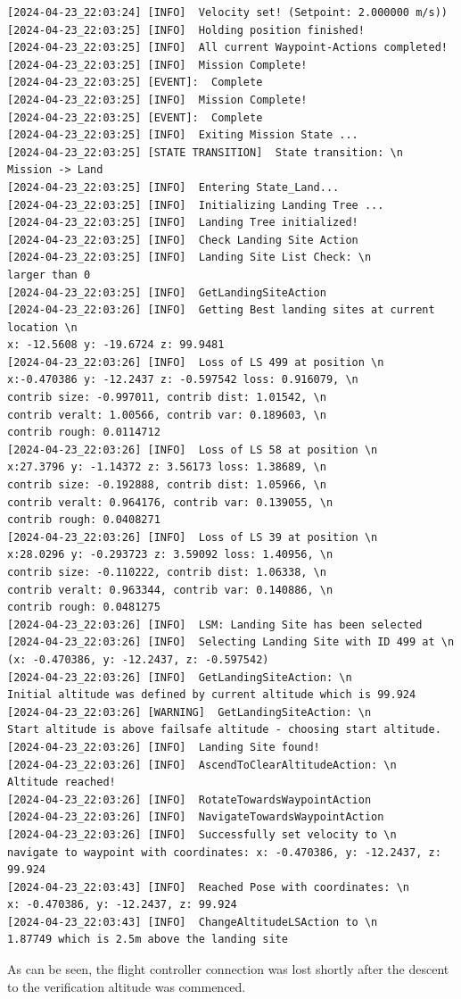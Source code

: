 \begin{lstlisting}
[2024-04-23_22:03:24] [INFO]  Velocity set! (Setpoint: 2.000000 m/s))
[2024-04-23_22:03:25] [INFO]  Holding position finished!
[2024-04-23_22:03:25] [INFO]  All current Waypoint-Actions completed!
[2024-04-23_22:03:25] [INFO]  Mission Complete!
[2024-04-23_22:03:25] [EVENT]:  Complete
[2024-04-23_22:03:25] [INFO]  Mission Complete!
[2024-04-23_22:03:25] [EVENT]:  Complete
[2024-04-23_22:03:25] [INFO]  Exiting Mission State ...
[2024-04-23_22:03:25] [STATE TRANSITION]  State transition: \n 
Mission -> Land
[2024-04-23_22:03:25] [INFO]  Entering State_Land...
[2024-04-23_22:03:25] [INFO]  Initializing Landing Tree ...
[2024-04-23_22:03:25] [INFO]  Landing Tree initialized!
[2024-04-23_22:03:25] [INFO]  Check Landing Site Action
[2024-04-23_22:03:25] [INFO]  Landing Site List Check: \n 
larger than 0
[2024-04-23_22:03:25] [INFO]  GetLandingSiteAction
[2024-04-23_22:03:26] [INFO]  Getting Best landing sites at current location \n 
x: -12.5608 y: -19.6724 z: 99.9481
[2024-04-23_22:03:26] [INFO]  Loss of LS 499 at position \n 
x:-0.470386 y: -12.2437 z: -0.597542 loss: 0.916079, \n 
contrib size: -0.997011, contrib dist: 1.01542, \n 
contrib veralt: 1.00566, contrib var: 0.189603, \n 
contrib rough: 0.0114712
[2024-04-23_22:03:26] [INFO]  Loss of LS 58 at position \n 
x:27.3796 y: -1.14372 z: 3.56173 loss: 1.38689, \n 
contrib size: -0.192888, contrib dist: 1.05966, \n 
contrib veralt: 0.964176, contrib var: 0.139055, \n 
contrib rough: 0.0408271
[2024-04-23_22:03:26] [INFO]  Loss of LS 39 at position \n 
x:28.0296 y: -0.293723 z: 3.59092 loss: 1.40956, \n 
contrib size: -0.110222, contrib dist: 1.06338, \n 
contrib veralt: 0.963344, contrib var: 0.140886, \n 
contrib rough: 0.0481275
[2024-04-23_22:03:26] [INFO]  LSM: Landing Site has been selected
[2024-04-23_22:03:26] [INFO]  Selecting Landing Site with ID 499 at \n 
(x: -0.470386, y: -12.2437, z: -0.597542)
[2024-04-23_22:03:26] [INFO]  GetLandingSiteAction: \n 
Initial altitude was defined by current altitude which is 99.924
[2024-04-23_22:03:26] [WARNING]  GetLandingSiteAction: \n 
Start altitude is above failsafe altitude - choosing start altitude.
[2024-04-23_22:03:26] [INFO]  Landing Site found!
[2024-04-23_22:03:26] [INFO]  AscendToClearAltitudeAction: \n 
Altitude reached!
[2024-04-23_22:03:26] [INFO]  RotateTowardsWaypointAction
[2024-04-23_22:03:26] [INFO]  NavigateTowardsWaypointAction
[2024-04-23_22:03:26] [INFO]  Successfully set velocity to \n 
navigate to waypoint with coordinates: x: -0.470386, y: -12.2437, z: 99.924
[2024-04-23_22:03:43] [INFO]  Reached Pose with coordinates: \n 
x: -0.470386, y: -12.2437, z: 99.924
[2024-04-23_22:03:43] [INFO]  ChangeAltitudeLSAction to \n 
1.87749 which is 2.5m above the landing site

\end{lstlisting}

As can be seen, the flight controller connection was lost shortly after the descent to the verification altitude was commenced.

